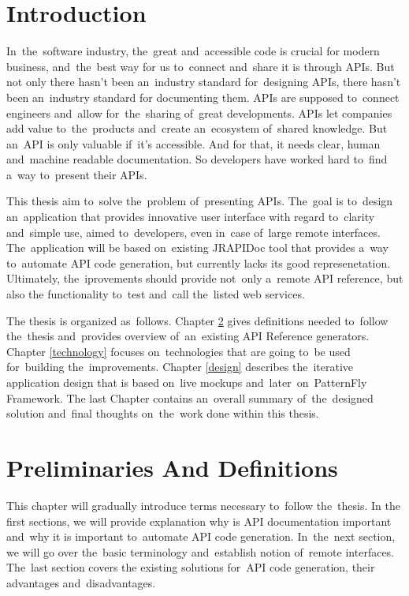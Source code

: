 
\chapter{Introduction}
In~the~software industry, the~great and~accessible code is crucial for modern
business, and~the~best way for us to~connect and~share it is through APIs. But
not only there hasn't been an~industry standard for~designing APIs, there hasn't
been an~industry standard for documenting them. APIs are supposed to~connect
engineers and~allow for~the~sharing of~great developments. APIs let companies
add value to~the~products and~create an~ecosystem of~shared knowledge. But
an~API is only valuable if~it's accessible. And for that, it needs clear, human
and~machine readable documentation. So developers have worked hard to~find a~way
to~present their APIs.

This thesis aim to~solve the~problem of~presenting APIs. The~goal is to~design
an~application that provides innovative user interface with regard to~clarity
and~simple use, aimed to~developers, even in~case of~large remote interfaces.
The~application will be based on~existing JRAPIDoc \cite{JRAPIDoc} tool that
provides a~way to~automate API code generation, but currently lacks its good
represenetation. Ultimately, the~iprovements should provide not~only
a~remote API reference, but also the functionality to~test and~call the~listed
web services.

The thesis is organized as~follows. Chapter \ref{preliminaries} gives
definitions needed to~follow the~thesis and~provides overview of~an~existing API
Reference generators. Chapter \ref{technology} focuses on~technologies that are
going to~be used for~building the~improvements. Chapter
\ref{design} describes the~iterative application design that is based on~live
mockups and~later~on~PatternFly Framework. The last Chapter contains an~overall summary
of~the~designed solution and~final thoughts on~the~work done within this thesis.

\chapter{Preliminaries And Definitions}
\label{preliminaries}
This chapter will gradually introduce terms necessary to~follow the~thesis.
In the first sections, we will provide explanation why is API documentation
important and~why it is important to~automate API code generation. In~the~next
section, we will go over the~basic terminology and~establish notion of~remote
interfaces. The~last section covers the existing solutions for~API code
generation, their advantages and~disadvantages.

